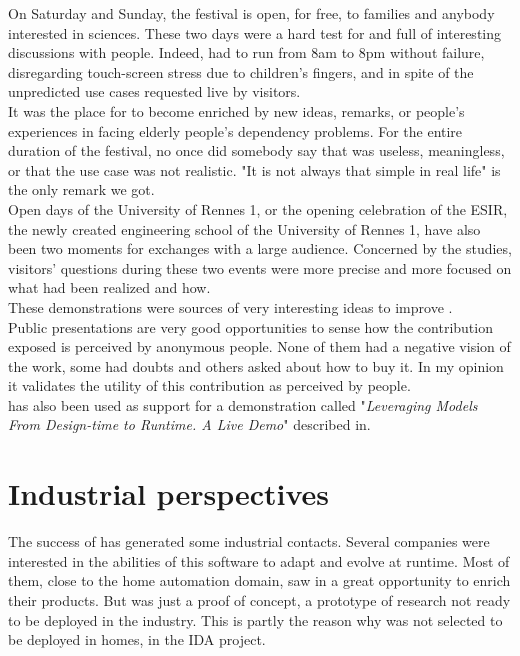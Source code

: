 On Saturday and Sunday, the festival is open, for free, to families and anybody interested in sciences. These two days were a hard test for \enti{} and full of interesting discussions with people. Indeed, \enti{} had to run from 8am to 8pm without failure, disregarding touch-screen stress due to children's fingers, and in spite of the unpredicted use cases requested live by visitors.\\
It was the place for \enti{} to become enriched by new ideas, remarks, or people's experiences in facing elderly people's dependency problems. For the entire duration of the festival, no once did somebody say that \enti{} was useless, meaningless, or that the use case was not realistic. "It is not always that simple in real life" is the only remark we got.\\

Open days of the University of Rennes 1, or the opening celebration of the ESIR, the newly created engineering school of the University of Rennes 1, have also been two moments for exchanges with a large audience. Concerned by the studies, visitors' questions during these two events were more precise and more focused on what had been realized and how.\\
These demonstrations were sources of very interesting ideas to improve \enti{}.\\

Public presentations are very good opportunities to sense how the contribution exposed is perceived by anonymous people. None of them had a negative vision of the work, some had doubts and others asked about how to buy it. In my opinion it validates the utility of this contribution as perceived by people.\\

\enti{} has also been used as support for a demonstration called "{\it Leveraging Models From Design-time to Runtime. A Live Demo}" described in\cite{Morin09e}.

\section{Industrial perspectives}

The success of \enti{} has generated some industrial contacts. Several companies were interested in the abilities of this software to adapt and evolve at runtime. Most of them, close to the home automation domain, saw in \enti{} a great opportunity to enrich their products. But \enti{} was just a proof of concept, a prototype of research not ready to be deployed in the industry. This is partly the reason why \enti{} was not selected to be deployed in homes, in the IDA project.\\

